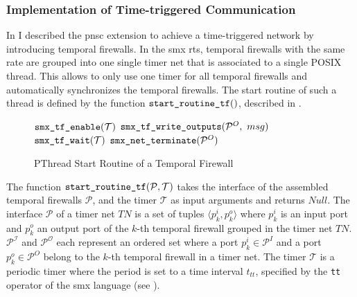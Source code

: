 \subsubsection{Implementation of Time-triggered Communication}
\label{sect_tool_rts_ch_tt}
In \Sect{\ref{sect_tcm_time_tt}} I described the \gls{pnsc} extension to achieve a time-triggered network by introducing temporal firewalls.
In the \gls*{smx} \gls{rts}, temporal firewalls with the same rate are grouped into one single timer net that is associated to a single POSIX thread.
This allows to only use one timer for all temporal firewalls and automatically synchronizes the temporal firewalls.
The start routine of such a thread is defined by the function $\textnormal{\tt start\_routine\_tf}()$, described in \Alg{\ref{alg_rts_timer}}.
\begin{figure}[bht]
    \TopAlgSpace
    \removelatexerror
    \begin{algorithm}[H]
        \caption{PThread Start Routine of a Temporal Firewall}
        \label{alg_rts_timer}
        \begin{algorithmic}[1]
            \Statex
            \State $\textnormal{\tt smx\_tf\_enable}( \mathcal{T} )$
                \State $\textnormal{\tt smx\_tf\_write\_outputs}( \mathcal{P}^O,\ msg )$
                \State $\textnormal{\tt smx\_tf\_wait}( \mathcal{T} )$
            \EndWhile
            \State $\textnormal{\tt smx\_net\_terminate}( \mathcal{P}^O )$
            \State {}
            \EndFunction
        \end{algorithmic}
    \end{algorithm}
    \BotAlgSpace
\end{figure}
The function $\textnormal{\tt start\_routine\_tf}(\mathcal{P}, \mathcal{T})$ takes the interface of the assembled temporal firewalls $\mathcal{P}$, and the timer $\mathcal{T}$ as input arguments and returns $Null$.
The interface $\mathcal{P}$ of a timer net $\mathit{TN}$ is a set of tuples $\langle p_k^i, p_k^o \rangle$ where $p_k^i$ is an input port and $p_k^o$ an output port of the $k$-th temporal firewall grouped in the timer net $\mathit{TN}$.
$\mathcal{P^I}$ and $\mathcal{P^O}$ each represent an ordered set where a port $p_k^i \in \mathcal{P}^I$ and a port $p_k^o \in \mathcal{P}^O$ belong to the $k$-th temporal firewall in a timer net.
The timer $\mathcal{T}$ is a periodic timer where the period is set to a time interval $t_{tt}$, specified by the \texttt{tt} operator of the \gls*{smx} language (see \Sect{\ref{sect_smx_network_time}}).


